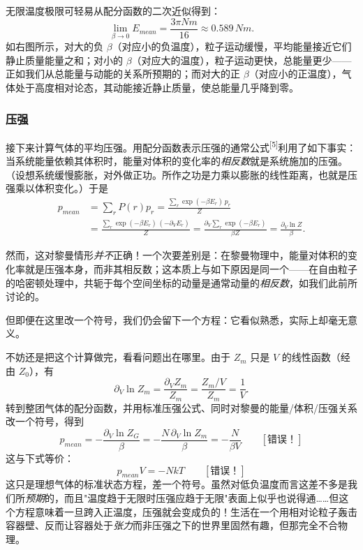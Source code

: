 
无限温度极限可轻易从配分函数的二次近似得到：
\begin{equation}
\lim_{\beta\to0}E_{mean}=\frac{3\pi Nm}{16}\approx 0.589\,Nm .
\end{equation}
如右图所示，对大的负 $\beta$（对应小的负温度），粒子运动缓慢，平均能量接近它们静止质量能量之和；对小的 $\beta$（对应大的温度），粒子运动更快，总能量更少——正如我们从总能量与动能的关系所预期的；而对大的正 $\beta$（对应小的正温度），气体处于高度相对论态，其动能接近静止质量，使总能量几乎降到零。

\subsubsection{压强}

接下来计算气体的平均压强。用配分函数表示压强的通常公式\textsuperscript{[5]}利用了如下事实：当系统能量依赖其体积时，能量对体积的变化率的\emph{相反数}就是系统施加的压强。（设想系统缓慢膨胀，对外做正功。所作之功是力乘以膨胀的线性距离，也就是压强乘以体积变化。）于是
\begin{align}
p_{mean}
&=\sum_{r}P(r)p_{r}
=\frac{\sum_{r}\exp(-\beta E_{r})\,p_{r}}{Z} \nonumber\\
&=\frac{\sum_{r}\exp(-\beta E_{r})\,(-\partial_{V}E_{r})}{Z}
=\frac{\partial_{V}\sum_{r}\exp(-\beta E_{r})}{\beta Z}
=\frac{\partial_{V}\ln Z}{\beta}.
\end{align}

然而，这对黎曼情形\emph{并不}正确！一个次要差别是：在黎曼物理中，能量对体积的变化率就是压强本身，而非其相反数；这本质上与如下原因是同一个——在自由粒子的哈密顿处理中，共轭于每个空间坐标的动量是通常动量的\emph{相反数}，如我们此前所讨论的。

但即便在这里改一个符号，我们仍会留下一个方程：它看似熟悉，实际上却毫无意义。

不妨还是把这个计算做完，看看问题出在哪里。由于 $Z_{m}$ 只是 $V$ 的线性函数（经由 $Z_{0}$），有
\begin{equation}
\partial_{V}\ln Z_{m}=\frac{\partial_{V}Z_{m}}{Z_{m}}=\frac{Z_{m}/V}{Z_{m}}=\frac{1}{V}.
\end{equation}
转到整团气体的配分函数，并用标准压强公式、同时对黎曼的能量/体积/压强关系改一个符号，得到
\begin{equation}
p_{mean}=-\frac{\partial_{V}\ln Z_{G}}{\beta}
=-\frac{N\,\partial_{V}\ln Z_{m}}{\beta}
=-\frac{N}{\beta V}\qquad[\text{错误！}]
\end{equation}
这与下式等价：
\begin{equation}
p_{mean}V=-NkT\qquad[\text{错误！}]
\end{equation}
这只是理想气体的标准状态方程，差一个符号。虽然对低负温度而言这差不多是我们所\emph{预期}的，而且"温度趋于无限时压强应趋于无限"表面上似乎也说得通……但这个方程意味着一旦跨入正温度，压强就会变成负的！生活在一个用相对论粒子轰击容器壁、反而让容器处于\emph{张力}而非压强之下的世界里固然有趣，但那完全不合物理。


